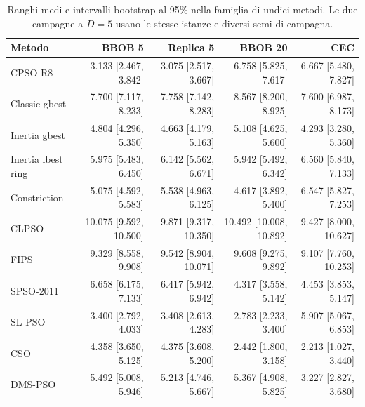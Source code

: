 \begin{table}[H]\centering\small
\caption{Ranghi medi e intervalli bootstrap al 95\% nella famiglia di undici metodi. Le due campagne a $D=5$ usano le stesse istanze e diversi semi di campagna.}\label{tab:family-ranks}
\begin{tabular}{@{}lrrrr@{}}
\toprule Metodo & BBOB 5 & Replica 5 & BBOB 20 & CEC\\\midrule
CPSO R8 & 3.133 [2.467, 3.842] & 3.075 [2.517, 3.667] & 6.758 [5.825, 7.617] & 6.667 [5.480, 7.827]\\
Classic gbest & 7.700 [7.117, 8.233] & 7.758 [7.142, 8.283] & 8.567 [8.200, 8.925] & 7.600 [6.987, 8.173]\\
Inertia gbest & 4.804 [4.296, 5.350] & 4.663 [4.179, 5.163] & 5.108 [4.625, 5.600] & 4.293 [3.280, 5.360]\\
Inertia lbest ring & 5.975 [5.483, 6.450] & 6.142 [5.562, 6.671] & 5.942 [5.492, 6.342] & 6.560 [5.840, 7.133]\\
Constriction & 5.075 [4.592, 5.583] & 5.538 [4.963, 6.125] & 4.617 [3.892, 5.400] & 6.547 [5.827, 7.253]\\
CLPSO & 10.075 [9.592, 10.500] & 9.871 [9.317, 10.350] & 10.492 [10.008, 10.892] & 9.427 [8.000, 10.627]\\
FIPS & 9.329 [8.558, 9.908] & 9.542 [8.904, 10.071] & 9.608 [9.275, 9.892] & 9.107 [7.760, 10.253]\\
SPSO-2011 & 6.658 [6.175, 7.133] & 6.417 [5.942, 6.942] & 4.317 [3.558, 5.142] & 4.453 [3.853, 5.147]\\
SL-PSO & 3.400 [2.792, 4.033] & 3.408 [2.613, 4.283] & 2.783 [2.233, 3.400] & 5.907 [5.067, 6.853]\\
CSO & 4.358 [3.650, 5.125] & 4.375 [3.608, 5.200] & 2.442 [1.800, 3.158] & 2.213 [1.027, 3.440]\\
DMS-PSO & 5.492 [5.008, 5.946] & 5.213 [4.746, 5.667] & 5.367 [4.908, 5.825] & 3.227 [2.827, 3.680]\\
\bottomrule\end{tabular}
\end{table}
